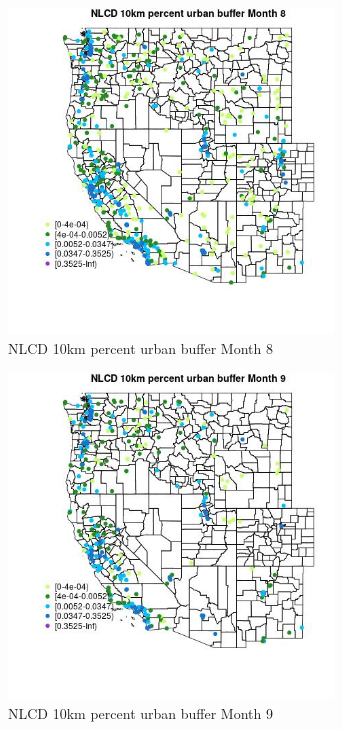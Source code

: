 \begin{figure} 
\centering  
\includegraphics[width=0.77\textwidth]{Code_Outputs/Report_ML_input_PM25_Step4_part_e_de_duplicated_aves_compiled_2019-05-18wNAs_MapObsMo8NLCD_10km_percent_urban_buffer.jpg} 
\caption{\label{fig:Report_ML_input_PM25_Step4_part_e_de_duplicated_aves_compiled_2019-05-18wNAsMapObsMo8NLCD_10km_percent_urban_buffer}NLCD 10km percent urban buffer Month 8} 
\end{figure} 
 

\clearpage 

\begin{figure} 
\centering  
\includegraphics[width=0.77\textwidth]{Code_Outputs/Report_ML_input_PM25_Step4_part_e_de_duplicated_aves_compiled_2019-05-18wNAs_MapObsMo9NLCD_10km_percent_urban_buffer.jpg} 
\caption{\label{fig:Report_ML_input_PM25_Step4_part_e_de_duplicated_aves_compiled_2019-05-18wNAsMapObsMo9NLCD_10km_percent_urban_buffer}NLCD 10km percent urban buffer Month 9} 
\end{figure} 
 

